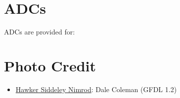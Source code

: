 \section{ADCs}

ADCs are provided for:
\begin{adclist}
\end{adclist}

\section{Photo Credit}
\begin{itemize}\raggedright
    \item \href{https://commons.wikimedia.org/wiki/File:British_Aerospace_Nimrod_MR.2,_United_Kingdom_-_Royal_Air_Force_(RAF)_JP506967.jpg}{Hawker Siddeley Nimrod}: Dale Coleman (GFDL 1.2)
\end{itemize}
